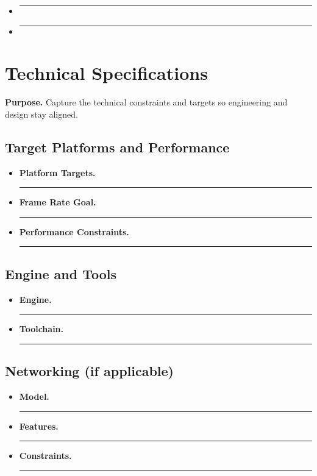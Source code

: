 \documentclass[12pt]{article}
\newcommand{\placeholder}[1]{\rule[-0.4em]{0pt}{2em}\rule{0.62\linewidth}{0.4pt}}
\begin{document}
\begin{itemize}
    \item \placeholder{How enemies, traps, puzzles, or challenges are distributed.}
    \item \placeholder{How difficulty escalates and how players learn new mechanics.}
\end{itemize}

\section{Technical Specifications}

\textbf{Purpose.} Capture the technical constraints and targets so engineering and design stay aligned.

\subsection{Target Platforms and Performance}

\begin{itemize}
    \item \textbf{Platform Targets.} \placeholder{PC, console, mobile, browser, etc.}
    \item \textbf{Frame Rate Goal.} \placeholder{Target FPS and resolution.}
    \item \textbf{Performance Constraints.} \placeholder{Memory, loading times, file size, etc.}
\end{itemize}

\subsection{Engine and Tools}

\begin{itemize}
    \item \textbf{Engine.} \placeholder{Game engine or custom framework.}
    \item \textbf{Toolchain.} \placeholder{Level editors, scripting tools, asset pipelines, etc.}
\end{itemize}

\subsection{Networking (if applicable)}

\begin{itemize}
    \item \textbf{Model.} \placeholder{Peer-to-peer, client-server, dedicated server, etc.}
    \item \textbf{Features.} \placeholder{Matchmaking, leaderboards, lobbies, cross-play, etc.}
    \item \textbf{Constraints.} \placeholder{Latency tolerance, bandwidth considerations, tick rate, etc.}
\end{itemize}
\end{document}
